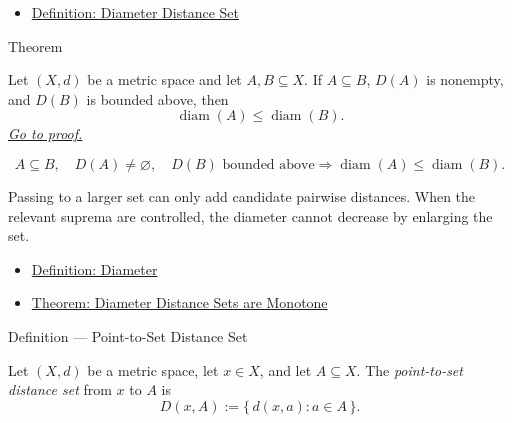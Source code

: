 \begin{dependencies}
\begin{itemize}
  \item \hyperref[def:metric-diameter-distance-set]{Definition: Diameter Distance Set}
\end{itemize}
\end{dependencies}

\begin{theorembox}{Theorem}
\begin{theorem}
\label{thm:metric-diameter-monotone-under-inclusion}
Let \((X,d)\) be a metric space and let \(A,B\subseteq X\).  If
\(A\subseteq B\), \(D(A)\) is nonempty, and \(D(B)\) is bounded above, then
\[
  \operatorname{diam}(A)\leq \operatorname{diam}(B).
\]
\hyperref[prf:metric-diameter-monotone-under-inclusion]{\textit{Go to proof.}}
\end{theorem}
\end{theorembox}

\begin{remark*}
\[
A\subseteq B,\quad D(A)\neq\varnothing,\quad D(B)\text{ bounded above}
\Longrightarrow
\operatorname{diam}(A)\leq \operatorname{diam}(B).
\]
\end{remark*}

\begin{remark*}[Interpretation]
Passing to a larger set can only add candidate pairwise distances.  When the
relevant suprema are controlled, the diameter cannot decrease by enlarging
the set.
\end{remark*}


\begin{dependencies}
\begin{itemize}
  \item \hyperref[def:metric-diameter]{Definition: Diameter}
  \item \hyperref[thm:metric-diameter-set-monotone]{Theorem: Diameter Distance Sets are Monotone}
\end{itemize}
\end{dependencies}

\begin{definitionbox}{Definition --- Point-to-Set Distance Set}
\begin{definition}\label{def:metric-point-set-distance-set}
Let \((X,d)\) be a metric space, let \(x\in X\), and let \(A\subseteq X\).
The \emph{point-to-set distance set} from \(x\) to \(A\) is
\[
  D(x,A)
  :=
  \{\,d(x,a):a\in A\,\}.
\]
\end{definition}
\end{definitionbox}

